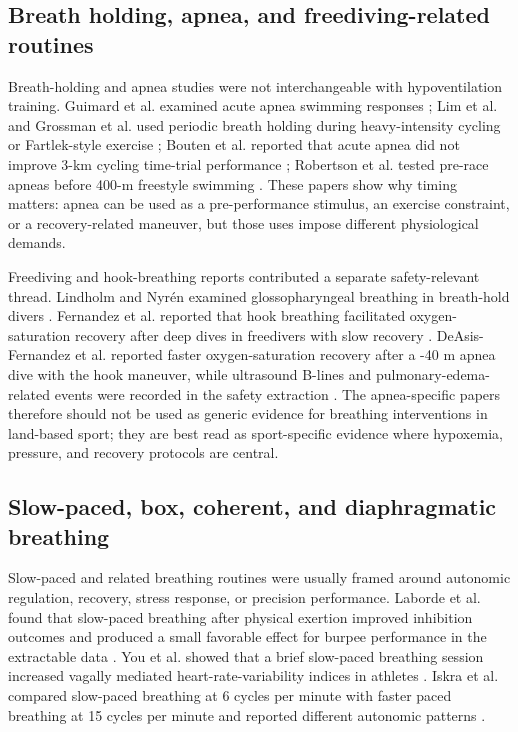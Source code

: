 \documentclass[12pt,a4paper]{article}
\begin{document}
\subsection{Breath holding, apnea, and freediving-related routines}
Breath-holding and apnea studies were not interchangeable with hypoventilation training. Guimard et al. examined acute apnea swimming responses \parencite{guimard_acute_2014}; Lim et al. and Grossman et al. used periodic breath holding during heavy-intensity cycling or Fartlek-style exercise \parencite{lim_physiological_2018,grossman_kj_and_lim_dj_and_murias_jm_and_belfry_gr_effect_2021}; Bouten et al. reported that acute apnea did not improve 3-km cycling time-trial performance \parencite{bouten_acute_2020}; Robertson et al. tested pre-race apneas before 400-m freestyle swimming \parencite{robertson_effects_2020}. These papers show why timing matters: apnea can be used as a pre-performance stimulus, an exercise constraint, or a recovery-related maneuver, but those uses impose different physiological demands.

Freediving and hook-breathing reports contributed a separate safety-relevant thread. Lindholm and Nyrén examined glossopharyngeal breathing in breath-hold divers \parencite{lindholm_p_and_nyren_s_studies_2005}. Fernandez et al. reported that hook breathing facilitated oxygen-saturation recovery after deep dives in freedivers with slow recovery \parencite{fernandez_hook_2019}. DeAsis-Fernandez et al. reported faster oxygen-saturation recovery after a -40 m apnea dive with the hook maneuver, while ultrasound B-lines and pulmonary-edema-related events were recorded in the safety extraction \parencite{deasis_fernandez_effects_2025}. The apnea-specific papers therefore should not be used as generic evidence for breathing interventions in land-based sport; they are best read as sport-specific evidence where hypoxemia, pressure, and recovery protocols are central.

\subsection{Slow-paced, box, coherent, and diaphragmatic breathing}
Slow-paced and related breathing routines were usually framed around autonomic regulation, recovery, stress response, or precision performance. Laborde et al. found that slow-paced breathing after physical exertion improved inhibition outcomes and produced a small favorable effect for burpee performance in the extractable data \parencite{laborde_influence_2019}. You et al. showed that a brief slow-paced breathing session increased vagally mediated heart-rate-variability indices in athletes \parencite{you_m_and_laborde_s_and_ackermann_s_and_borges_u_and_dosseville_f_and_mosley_e_influence_2024}. Iskra et al. compared slow-paced breathing at 6 cycles per minute with faster paced breathing at 15 cycles per minute and reported different autonomic patterns \parencite{iskra_m_and_laborde_s_and_poppa_t_and_salvotti_c_and_weinand_e_and_raab_m_and_voigt_l_specifying_2026}.
\end{document}
